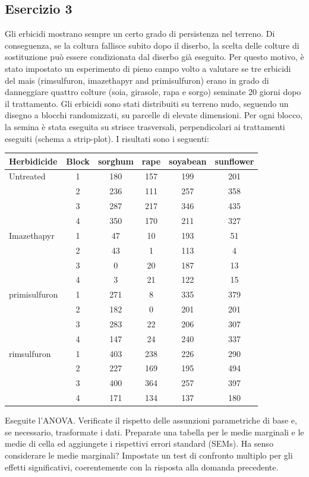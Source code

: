 \documentclass[a4paper,12pt,oneside]{book}
\begin{document}
\hypertarget{esercizio-3-6}{%
\subsection{Esercizio 3}\label{esercizio-3-6}}

Gli erbicidi mostrano sempre un certo grado di persistenza nel terreno. Di conseguenza, se la coltura fallisce subito dopo il diserbo, la scelta delle colture di sostituzione può essere condizionata dal diserbo già eseguito. Per questo motivo, è stato impostato un esperimento di pieno campo volto a valutare se tre erbicidi del mais (rimsulfuron, imazethapyr and primisulfuron) erano in grado di danneggiare quattro colture (soia, girasole, rapa e sorgo) seminate 20 giorni dopo il trattamento. Gli erbicidi sono stati distribuiti su terreno nudo, seguendo un disegno a blocchi randomizzati, su parcelle di elevate dimensioni. Per ogni blocco, la semina è stata eseguita su strisce trasversali, perpendicolari ai trattamenti eseguiti (schema a strip-plot). I risultati sono i seguenti:

\begin{longtable}[]{@{}lccccc@{}}
\toprule
Herbidicide & Block & sorghum & rape & soyabean & sunflower \\
\midrule
\endhead
Untreated & 1 & 180 & 157 & 199 & 201 \\
& 2 & 236 & 111 & 257 & 358 \\
& 3 & 287 & 217 & 346 & 435 \\
& 4 & 350 & 170 & 211 & 327 \\
Imazethapyr & 1 & 47 & 10 & 193 & 51 \\
& 2 & 43 & 1 & 113 & 4 \\
& 3 & 0 & 20 & 187 & 13 \\
& 4 & 3 & 21 & 122 & 15 \\
primisulfuron & 1 & 271 & 8 & 335 & 379 \\
& 2 & 182 & 0 & 201 & 201 \\
& 3 & 283 & 22 & 206 & 307 \\
& 4 & 147 & 24 & 240 & 337 \\
rimsulfuron & 1 & 403 & 238 & 226 & 290 \\
& 2 & 227 & 169 & 195 & 494 \\
& 3 & 400 & 364 & 257 & 397 \\
& 4 & 171 & 134 & 137 & 180 \\
\bottomrule
\end{longtable}

Eseguite l'ANOVA. Verificate il rispetto delle assunzioni parametriche di base e, se necessario, trasformate i dati. Preparate una tabella per le medie marginali e le medie di cella ed aggiungete i rispettivi errori standard (SEMs). Ha senso considerare le medie marginali? Impostate un test di confronto multiplo per gli effetti significativi, coerentemente con la risposta alla domanda precedente.
\end{document}
